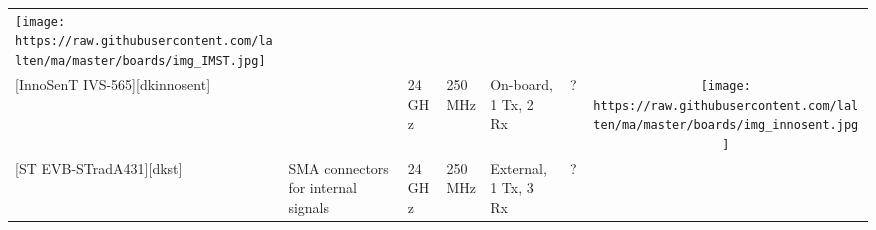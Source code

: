\begin{longtable}[]{@{}llllllc@{}}
\begin{minipage}[t]{0.10\columnwidth}
\texttt{[image: https://raw.githubusercontent.com/lalten/ma/master/boards/img\_IMST.jpg]}\strut
\end{minipage}\tabularnewline
\begin{minipage}[t]{0.09\columnwidth}\raggedright\strut
{[}InnoSenT IVS-565{]}{[}dkinnosent{]}\strut
\end{minipage} & \begin{minipage}[t]{0.13\columnwidth}\raggedright\strut
\strut
\end{minipage} & \begin{minipage}[t]{0.09\columnwidth}\raggedright\strut
24GHz\strut
\end{minipage} & \begin{minipage}[t]{0.11\columnwidth}\raggedright\strut
250MHz\strut
\end{minipage} & \begin{minipage}[t]{0.10\columnwidth}\raggedright\strut
On-board, 1 Tx, 2 Rx\strut
\end{minipage} & \begin{minipage}[t]{0.15\columnwidth}\raggedright\strut
?\strut
\end{minipage} & \begin{minipage}[t]{0.10\columnwidth}\centering\strut
\texttt{[image: https://raw.githubusercontent.com/lalten/ma/master/boards/img\_innosent.jpg]}\strut
\end{minipage}\tabularnewline
\begin{minipage}[t]{0.09\columnwidth}\raggedright\strut
{[}ST EVB-STradA431{]}{[}dkst{]}\strut
\end{minipage} & \begin{minipage}[t]{0.13\columnwidth}\raggedright\strut
SMA connectors for internal signals\strut
\end{minipage} & \begin{minipage}[t]{0.09\columnwidth}\raggedright\strut
24GHz\strut
\end{minipage} & \begin{minipage}[t]{0.11\columnwidth}\raggedright\strut
250MHz\strut
\end{minipage} & \begin{minipage}[t]{0.10\columnwidth}\raggedright\strut
External, 1 Tx, 3 Rx\strut
\end{minipage} & \begin{minipage}[t]{0.15\columnwidth}\raggedright\strut
?\strut
\end{minipage} & \begin{minipage}[t]{0.10\columnwidth}\centering\strut

\end{minipage}
\end{longtable}

